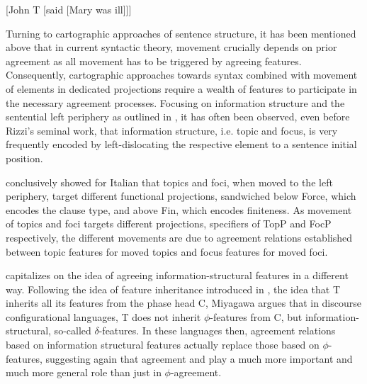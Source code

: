 \documentclass[output=paper
,modfonts
,nonflat]{langsci/langscibook}
\begin{document}
\begin{exe}
	\ex \label{ex:tense} {[}John T  [said [Mary was ill]]] \hfill \citet{Zeijlstra2012}
\end{exe}
Turning to cartographic approaches of sentence structure, it has been mentioned above that in current syntactic theory, movement crucially depends on prior agreement as all movement has to be triggered by agreeing features. Consequently, cartographic approaches towards syntax combined with movement of elements in dedicated projections require a wealth of features to participate in the necessary agreement processes. Focusing on information structure and the sentential left periphery as outlined in \citet{Rizzi1997}, it has often been observed, even before Rizzi's seminal work, that information structure, i.e. topic and focus, is very frequently encoded by left-dislocating the respective element to a sentence initial position.

\citet{Rizzi1997} conclusively showed for Italian that topics and foci, when moved to the left periphery, target different functional projections, sandwiched below Force, which encodes the clause type, and above Fin, which encodes finiteness. As movement of topics and foci targets different projections, specifiers of TopP and FocP respectively, the different movements are due to agreement relations established between topic features for moved topics and focus features for moved foci. 

\citet{Miyagawa2010,Miyagawa2017} capitalizes on the idea of agreeing information-structural features in a different way. Following the idea of feature inheritance introduced in \citet{Chomsky2008}, the idea that T inherits all its features from the phase head C, Miyagawa argues that in discourse configurational languages, T does not inherit $\phi$-features from C, but information-structural, so-called $\delta$-features. In these languages then, agreement relations based on information structural features actually replace those based on $\phi$-features, suggesting again that agreement and {\agr} play a much more important and much more general role than just in $\phi$-agreement.
\end{document}
